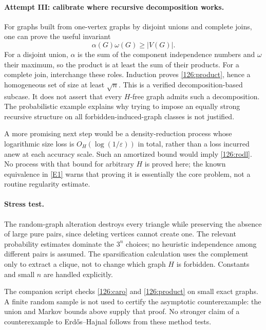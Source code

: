 \documentclass[11pt,a4paper]{article}
\newcommand{\eref}[2]{\hyperlink{extra:#1:#2}{[E#2]}}
\numberwithin{equation}{section}
\begin{document}
\paragraph{Attempt III: calibrate where recursive decomposition works.}
For graphs built from one-vertex graphs by disjoint unions and complete
joins, one can prove the useful invariant
\begin{equation}\label{126:product}
 \alpha(G)\omega(G)\geq|V(G)|.
\end{equation}
For a disjoint union, $\alpha$ is the sum of the component independence
numbers and $\omega$ their maximum, so the product is at least the
sum of their products.  For a complete join, interchange these roles.
Induction proves \eqref{126:product}, hence a homogeneous set of size
at least $\sqrt n$.  This is a verified decomposition-based subcase.
It does not assert that every $H$-free graph admits such a decomposition.
The probabilistic example explains why trying to impose an equally
strong recursive structure on all forbidden-induced-graph classes is
not justified.

A more promising next step would be a density-reduction process whose
logarithmic size loss is $O_H(\log(1/\varepsilon))$ in total, rather
than a loss incurred anew at each accuracy scale.  Such an amortized
bound would imply \eqref{126:rodl}.  No process with that bound for
arbitrary $H$ is proved here; the known equivalence in \eref{126}{1}
warns that proving it is essentially the core problem, not a routine
regularity estimate.

\paragraph{Stress test.}
The random-graph alteration destroys every triangle while preserving
the absence of large pure pairs, since deleting vertices cannot create
one.  The relevant probability estimates dominate the $3^n$ choices;
no heuristic independence among different pairs is assumed.  The
sparsification calculation uses the complement only to extract a
clique, not to change which graph $H$ is forbidden.  Constants and small
$n$ are handled explicitly.

The companion script checks \eqref{126:caro} and
\eqref{126:product} on small exact graphs.  A finite random sample is
not used to certify the asymptotic counterexample: the union and Markov
bounds above supply that proof.  No stronger claim of a counterexample
to Erd\H{o}s--Hajnal follows from these method tests.
\end{document}
